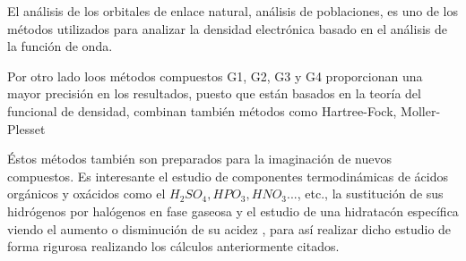 El análisis de los orbitales de enlace natural, análisis de poblaciones, es uno de los métodos utilizados para analizar la densidad electrónica basado en el análisis de la función de onda.

Por otro lado loos métodos compuestos G1, G2, G3 y G4 proporcionan una mayor precisión en los resultados, puesto que están basados en la teoría del funcional de densidad, combinan también métodos como Hartree-Fock, Moller-Plesset

Éstos métodos también son preparados para la imaginación de nuevos compuestos. Es interesante el estudio de componentes termodinámicas de ácidos orgánicos y oxácidos como el $H_2SO_4, HPO_3, HNO_3...$, etc., la sustitución de sus hidrógenos por halógenos en fase gaseosa y el estudio de una hidratacón específica viendo el aumento o disminución de su acidez \cite{quimica3}, para así realizar dicho estudio de forma rigurosa realizando los cálculos anteriormente citados.
